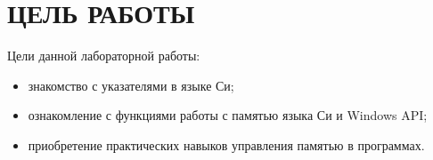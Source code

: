 \section{ЦЕЛЬ РАБОТЫ}

Цели данной лабораторной работы:

\begin{itemize}
\item
  знакомство с указателями в языке Си;
\item
  ознакомление с функциями работы с памятью языка Си и Windows API;
\item
  приобретение практических навыков управления памятью в программах.
\end{itemize}

\newpage